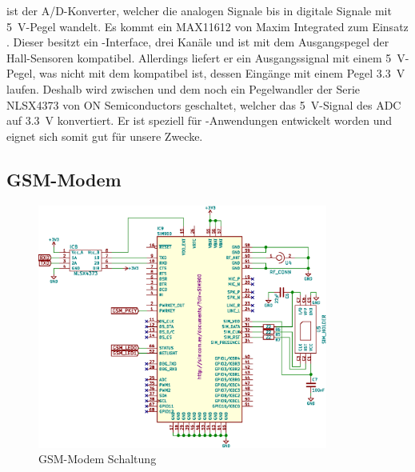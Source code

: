    ist    der   A/D-Konverter,   welcher   die    analogen   Signale
 bis  in  digitale Signale mit \SI{5}{\volt}-Pegel
wandelt. Es   kommt   ein   MAX11612   von  Maxim   Integrated   zum   Einsatz
\cite{datasheet:adc}. Dieser besitzt ein \ISC-Interface, drei Kan\"ale und ist
mit  dem  Ausgangspegel  der  Hall-Sensoren  kompatibel.   Allerdings  liefert
er  ein  Ausgangssignal  mit  einem \SI{5}{\volt}-Pegel,  was  nicht  mit  dem
\Raspi  kompatibel  ist, dessen  Eing\"ange  mit  einem Pegel  \SI{3.3}{\volt}
laufen. Deshalb wird zwischen  und  dem \Raspi noch ein Pegelwandler
der   Serie   NLSX4373  von   ON   Semiconductors   geschaltet,  welcher   das
\SI{5}{\volt}-Signal des ADC auf  \SI{3.3}{\volt} konvertiert. Er ist speziell
f\"ur  \ISC-Anwendungen entwickelt  worden  und eignet  sich  somit gut  f\"ur
unsere Zwecke.


\clearpage
\subsection{GSM-Modem}
\label{subsec:hw:master:gsm}

\begin{figure}[h!t]
    \centering
    \includegraphics[width=0.85\textwidth]{images/superv-sch/supervisor--sch--gsm.eps}
    \caption{GSM-Modem Schaltung}
    \label{fig:sch:master:gsm}
\end{figure}


